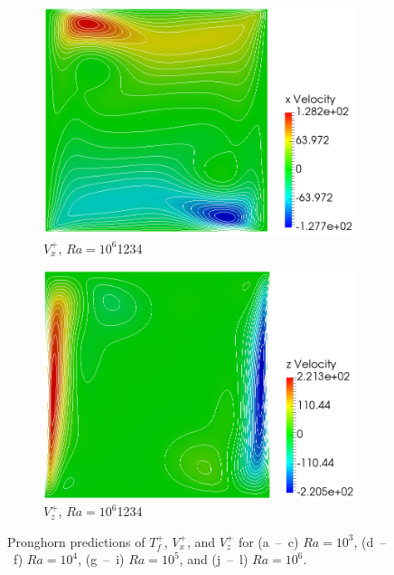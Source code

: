 \begin{figure}[!h]
\begin{subfigure}{0.32\textwidth}
  \includegraphics[width=\linewidth]{figs/Ra6_u.png}
  \caption{\(V_x^+\), \(Ra=10^6\)\color{white}1234}
  \label{fig:Ra6u}
    \vspace*{0.5em}
\end{subfigure}
\begin{subfigure}{0.32\textwidth}
  \centering
  \includegraphics[width=\linewidth]{figs/Ra6_v.png}
  \caption{\(V_z^+\), \(Ra=10^6\)\color{white}1234}
  \label{fig:Ra6v}
    \vspace*{0.5em}
\end{subfigure}
\caption{Pronghorn predictions of \(T_f^+\), \(V_x^+\), and \(V_z^+\) for \mbox{(a -- c)} \(Ra=10^3\), \mbox{(d -- f)} \(Ra=10^4\), \mbox{(g -- i)} \(Ra=10^5\), and \mbox{(j -- l)} \(Ra=10^6\).}
\label{fig:rb_results}
\end{figure}

